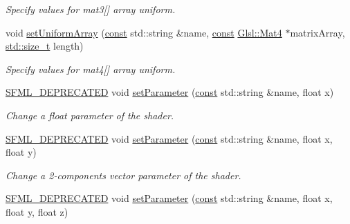 \begin{DoxyCompactItemize}
\begin{DoxyCompactList}\small\item\em Specify values for {\ttfamily mat3}\mbox{[}\mbox{]} array uniform. \end{DoxyCompactList}\item 
void \hyperlink{classsf_1_1_shader_a066b0ba02e1c1bddc9e2571eca1156ab}{set\-Uniform\-Array} (\hyperlink{term__entry_8h_a57bd63ce7f9a353488880e3de6692d5a}{const} std\-::string \&name, \hyperlink{term__entry_8h_a57bd63ce7f9a353488880e3de6692d5a}{const} \hyperlink{namespacesf_1_1_glsl_aab545f0a373a3ea8ad145811b747f3e4}{Glsl\-::\-Mat4} $\ast$matrix\-Array, \hyperlink{nc__alloc_8h_a7b60c5629e55e8ec87a4547dd4abced4}{std\-::size\-\_\-t} length)
\begin{DoxyCompactList}\small\item\em Specify values for {\ttfamily mat4}\mbox{[}\mbox{]} array uniform. \end{DoxyCompactList}\item 
\hyperlink{sfml_2dep_2_s_f_m_l-2_84_82_2include_2_s_f_m_l_2_config_8hpp_a9d22ae32bba2961ae9abc7e40f035fc7}{S\-F\-M\-L\-\_\-\-D\-E\-P\-R\-E\-C\-A\-T\-E\-D} void \hyperlink{classsf_1_1_shader_a4d6ec78f6de1a0a2146c93ab09d7d762}{set\-Parameter} (\hyperlink{term__entry_8h_a57bd63ce7f9a353488880e3de6692d5a}{const} std\-::string \&name, float x)
\begin{DoxyCompactList}\small\item\em Change a float parameter of the shader. \end{DoxyCompactList}\item 
\hyperlink{sfml_2dep_2_s_f_m_l-2_84_82_2include_2_s_f_m_l_2_config_8hpp_a9d22ae32bba2961ae9abc7e40f035fc7}{S\-F\-M\-L\-\_\-\-D\-E\-P\-R\-E\-C\-A\-T\-E\-D} void \hyperlink{classsf_1_1_shader_a61f5cdb5847fc3b57335b095a2f3dad3}{set\-Parameter} (\hyperlink{term__entry_8h_a57bd63ce7f9a353488880e3de6692d5a}{const} std\-::string \&name, float x, float y)
\begin{DoxyCompactList}\small\item\em Change a 2-\/components vector parameter of the shader. \end{DoxyCompactList}\item 
\hyperlink{sfml_2dep_2_s_f_m_l-2_84_82_2include_2_s_f_m_l_2_config_8hpp_a9d22ae32bba2961ae9abc7e40f035fc7}{S\-F\-M\-L\-\_\-\-D\-E\-P\-R\-E\-C\-A\-T\-E\-D} void \hyperlink{classsf_1_1_shader_a1fa0fb11cabd8553ccd37e97c725c992}{set\-Parameter} (\hyperlink{term__entry_8h_a57bd63ce7f9a353488880e3de6692d5a}{const} std\-::string \&name, float x, float y, float z)

\end{DoxyCompactItemize}
